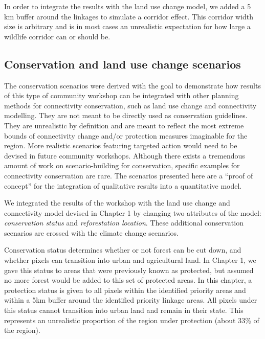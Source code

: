 In order to integrate the results with the land use change model, we added a 5 km buffer around the linkages to simulate a corridor effect. This corridor width size is arbitrary and is in most cases  an unrealistic expectation for how large a wildlife corridor can or should be. \\

\subsection{Conservation and land use change scenarios}

The conservation scenarios were derived with the goal to demonstrate how results of this type of community workshop can be integrated with other planning methods for connectivity conservation, such as land use change and connectivity modelling. They are not meant to be directly used as conservation guidelines. They are unrealistic by definition and are meant to reflect the most extreme bounds of connectivity change and/or protection measures imaginable for the region. More realistic scenarios featuring targeted action would need to be devised in future community workshops. Although there exists a tremendous amount of work on scenario-building for conservation, specific examples for connectivity conservation are rare. The scenarios presented here are a “proof of concept” for the integration of qualitative results into a quantitative model. 

We integrated the results of the workshop with the land use change and connectivity model devised in Chapter 1 by changing two attributes of the model: \textit{conservation status} and \textit{reforestation location}. These additional conservation scenarios are crossed with the climate change scenarios.

Conservation status determines whether or not forest can be cut down, and whether pixels can transition into urban and agricultural land. In Chapter 1, we gave this status to areas that were previously known as protected, but assumed no more forest would be added to this set of protected areas. In this chapter, a protection status is given to all pixels within the identified priority areas and within a 5km buffer around the identified priority linkage areas. All pixels under this status cannot transition into urban land and remain in their state. This represents an unrealistic proportion of the region under protection (about 33\% of the region).

